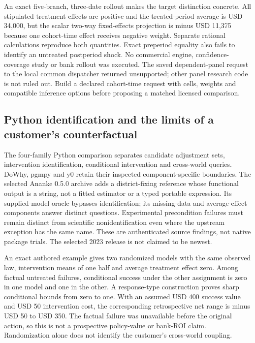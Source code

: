 An exact five-branch, three-date rollout makes the target distinction
concrete. All stipulated treatment effects are positive and the
treated-period average is USD 34,000, but the scalar two-way
fixed-effects projection is minus USD 11,375 because one cohort-time
effect receives negative weight. Separate rational calculations
reproduce both quantities. Exact preperiod equality also fails to
identify an untreated postperiod shock. No commercial engine,
confidence-coverage study or bank rollout was executed. The saved
dependent-panel request to the local common dispatcher returned
unsupported; other panel research code is not ruled out. Build a
declared cohort-time request with cells, weights and compatible
inference options before proposing a matched licensed comparison.
\citep{exec18_gp_panel_reference,exec18_gp_dispatch}

\hypertarget{python-identification-and-the-limits-of-a-customers-counterfactual}{%
\subsection{Python identification and the limits of a customer's
counterfactual}\label{python-identification-and-the-limits-of-a-customers-counterfactual}}

The four-family Python comparison separates candidate adjustment sets,
intervention identification, conditional intervention and cross-world
queries. DoWhy, pgmpy and y0 retain their inspected component-specific
boundaries. The selected Ananke 0.5.0 archive adds a district-fixing
reference whose functional output is a string, not a fitted estimator or
a typed portable expression. Its supplied-model oracle bypasses
identification; its missing-data and average-effect components answer
distinct questions. Experimental precondition failures must remain
distinct from scientific nonidentification even where the upstream
exception has the same name. These are authenticated source findings,
not native package trials. The selected 2023 release is not claimed to
be newest.
\citep{exec18_pyid_contract,exec18_pyid_one_line,exec18_pyid_oracle,
exec18_pyid_missing,exec18_pyid_mean}

An exact authored example gives two randomized models with the same
observed law, intervention means of one half and average treatment
effect zero. Among factual untreated failures, conditional success under
the other assignment is zero in one model and one in the other. A
response-type construction proves sharp conditional bounds from zero to
one. With an assumed USD 400 success value and USD 50 intervention cost,
the corresponding retrospective net range is minus USD 50 to USD 350.
The factual failure was unavailable before the original action, so this
is not a prospective policy-value or bank-ROI claim. Randomization alone
does not identify the customer's cross-world coupling.
\citep{exec18_pyid_coupling}

